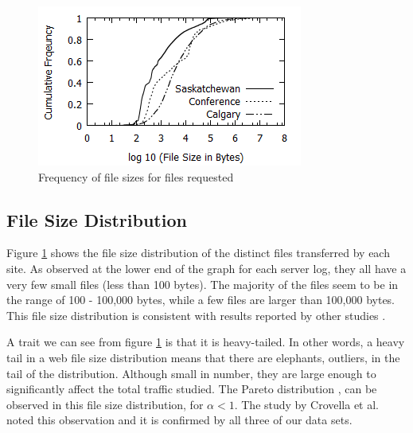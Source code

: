 \documentclass[10pt,conference]{IEEEtran}
\begin{document}
\begin{figure}[t]
    \includegraphics{images/filesize}
    \caption{Frequency of file sizes for files requested}\label{fig:filesize}
\end{figure}

\subsection{File Size Distribution} %
\label{sub:file_size_distribution}
Figure \ref{fig:filesize} shows the file size distribution of the distinct files transferred by each site. As observed at the lower end of the graph for each server log, they all have a very few small files (less than 100 bytes). The majority of the files seem to be in the range of 100 - 100,000 bytes, while a few files are larger than 100,000 bytes. This file size distribution is consistent with results reported by other studies \cite{keynote, Braun}.

A trait we can see from figure \ref{fig:filesize} is that it is heavy-tailed. In other words, a heavy tail in a web file size distribution means that there are elephants, outliers, in the tail of the distribution. Although small in number, they are large enough to significantly affect the total traffic studied. The Pareto distribution \cite{Kotz}, can be observed in this file size distribution, for \begin{math} \alpha < 1\end{math}. The study by Crovella et al. \cite{Crovella} noted this observation and it is confirmed by all three of our data sets.
\end{document}
